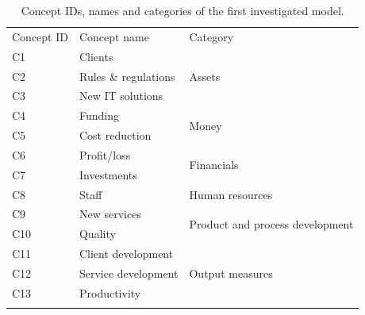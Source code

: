 \documentclass[graybox]{svmult}
\begin{document}
\begin{table}
\caption{Concept IDs, names and categories of the first investigated model.}
\label{tab:OMcategories}
\begin{center}
\begin{tabular}{lll}
\hline\noalign{\smallskip}
Concept ID & Concept name & Category\\
\noalign{\smallskip}\svhline\noalign{\smallskip}
C1 & Clients & \multirow{3}{*}{Assets}\\
C2 & Rules \& regulations & \\
C3 & New IT solutions & \\
\noalign{\smallskip} \hline \noalign{\smallskip}
C4 & Funding & \multirow{2}{*}{Money}\\
C5 & Cost reduction & \\
\noalign{\smallskip} \hline \noalign{\smallskip}
C6 & Profit/loss & \multirow{2}{*}{Financials}\\
C7 & Investments & \\
\noalign{\smallskip} \hline \noalign{\smallskip}
C8 & Staff & Human resources\\
\noalign{\smallskip} \hline \noalign{\smallskip}
C9 & New services & \multirow{2}{*}{Product and process development}\\
C10 & Quality & \\
\noalign{\smallskip} \hline \noalign{\smallskip}
C11 & Client development & \multirow{3}{*}{Output measures}\\
C12 & Service development & \\
C13 & Productivity & \\
\noalign{\smallskip} \hline
\end{tabular}
\end{center}
\end{table}
\end{document}
